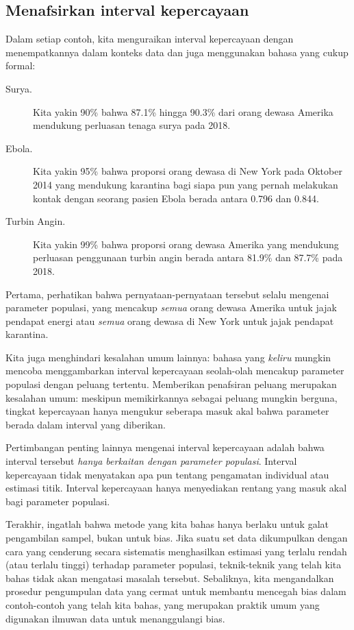 \subsection{Menafsirkan interval kepercayaan}
\label{interpretingCIs}


Dalam setiap contoh, kita menguraikan interval
kepercayaan dengan menempatkannya dalam konteks data dan juga
menggunakan bahasa yang cukup formal:
\begin{description}
  \item[Surya.] Kita yakin 90\% bahwa 87.1\% hingga 90.3\% dari
      orang dewasa Amerika mendukung perluasan tenaga surya pada 2018.
  \item[Ebola.] Kita yakin 95\% bahwa proporsi
      orang dewasa di New York pada Oktober 2014 yang mendukung karantina
      bagi siapa pun yang pernah melakukan kontak dengan seorang pasien Ebola
      berada antara 0.796 dan 0.844.
  \item[Turbin Angin.] Kita yakin 99\% bahwa proporsi
      orang dewasa Amerika yang mendukung perluasan penggunaan
      turbin angin berada antara 81.9\% dan 87.7\% pada 2018.
\end{description}
Pertama, perhatikan bahwa pernyataan-pernyataan tersebut selalu mengenai parameter
populasi, yang mencakup \emph{semua} orang dewasa Amerika untuk
jajak pendapat energi atau \emph{semua} orang dewasa di New York untuk jajak pendapat karantina.

Kita juga menghindari kesalahan umum lainnya:
bahasa yang \emph{keliru} mungkin mencoba menggambarkan interval kepercayaan
seolah-olah mencakup parameter populasi dengan peluang tertentu.
Memberikan penafsiran peluang merupakan kesalahan umum:
meskipun memikirkannya sebagai peluang mungkin berguna,
tingkat kepercayaan hanya mengukur seberapa masuk akal
bahwa parameter berada dalam interval yang diberikan.

Pertimbangan penting lainnya mengenai interval kepercayaan adalah bahwa interval tersebut
\emph{hanya berkaitan dengan parameter populasi}.
Interval kepercayaan tidak menyatakan apa pun tentang
pengamatan individual atau estimasi titik.
Interval kepercayaan hanya menyediakan rentang yang masuk akal bagi
parameter populasi.

Terakhir, ingatlah bahwa metode yang kita bahas hanya berlaku
untuk galat pengambilan sampel, bukan untuk bias.
Jika suatu set data dikumpulkan dengan cara yang cenderung
secara sistematis menghasilkan estimasi yang terlalu rendah
(atau terlalu tinggi) terhadap parameter populasi, teknik-teknik
yang telah kita bahas tidak akan mengatasi masalah tersebut.
Sebaliknya, kita mengandalkan prosedur pengumpulan data yang cermat untuk
membantu mencegah bias dalam contoh-contoh yang telah kita bahas,
yang merupakan praktik umum yang digunakan ilmuwan data
untuk menanggulangi bias.

